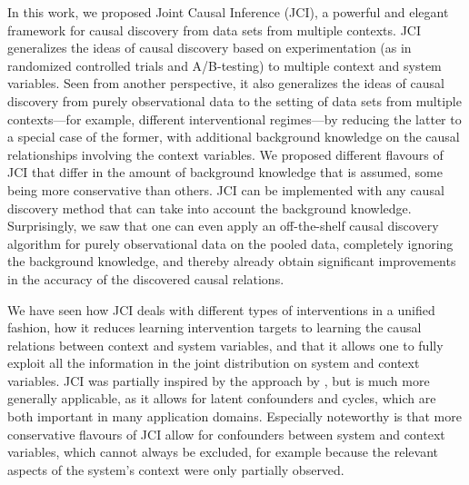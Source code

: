 \documentclass[twoside,11pt]{article}
\begin{document}
In this work, we proposed Joint Causal Inference (JCI), a powerful and elegant
framework for causal discovery from data sets from multiple contexts. JCI
generalizes the ideas of causal discovery based on experimentation (as in
randomized controlled trials and A/B-testing) to multiple context and system
variables. Seen from another perspective, it also generalizes the ideas of
causal discovery from purely observational data to the setting of data sets from
multiple contexts---for example, different interventional regimes---by reducing
the latter to a special case of the former, with additional background
knowledge on the causal relationships involving the context variables.
We proposed different flavours of JCI that differ in the amount of background knowledge that is
assumed, some being more conservative than others.
JCI can
be implemented with any causal discovery method that can take into account the 
background knowledge. Surprisingly, we saw that one can even apply an
off-the-shelf causal discovery algorithm for purely observational data on the
pooled data, completely ignoring the background knowledge, and thereby
already obtain significant improvements in the accuracy of the discovered
causal relations.

We have seen how JCI deals with different 
types of interventions in a unified fashion, how it reduces learning intervention targets
to learning the causal relations between context and system variables, and that it
allows one to fully exploit all the information in the joint distribution on system and context variables.
JCI was partially inspired by the approach by \citet{EatonMurphy07}, but is much more generally applicable,
as it allows for latent confounders and cycles, which are both important in many application domains. 
Especially noteworthy is that more conservative flavours of JCI allow for confounders between system 
and context variables, which cannot always be excluded, for example because the relevant aspects of the
system's context were only partially observed. 
\end{document}
